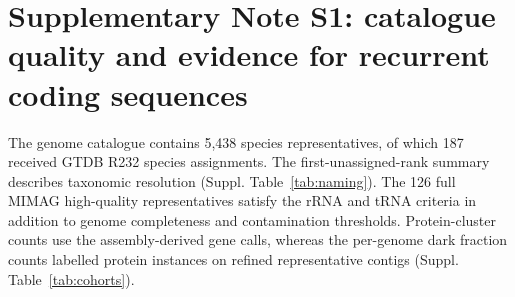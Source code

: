 \setcounter{table}{0}
\renewcommand{\thetable}{S\arabic{table}}
\renewcommand{\theHtable}{S\arabic{table}}
\section*{Supplementary Note S1: catalogue quality and evidence for recurrent coding sequences}

The genome catalogue contains 5,438 species representatives, of which 187 received GTDB R232 species assignments. The first-unassigned-rank summary describes taxonomic resolution (Suppl. Table~\ref{tab:naming}). The 126 full MIMAG high-quality representatives satisfy the rRNA and tRNA criteria in addition to genome completeness and contamination thresholds. Protein-cluster counts use the assembly-derived gene calls, whereas the per-genome dark fraction counts labelled protein instances on refined representative contigs (Suppl. Table~\ref{tab:cohorts}).

